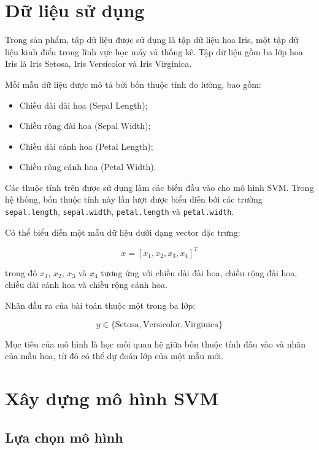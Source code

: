 \documentclass[12pt,a4paper]{report}
\begin{document}
		\section{Dữ liệu sử dụng}
		
		Trong sản phẩm, tập dữ liệu được sử dụng là tập dữ liệu hoa Iris, một tập dữ liệu kinh điển trong lĩnh vực học máy và thống kê. Tập dữ liệu gồm ba lớp hoa
		Iris là Iris Setosa, Iris Versicolor và Iris Virginica.
		
		\noindent
		Mỗi mẫu dữ liệu được mô tả bởi bốn thuộc tính đo lường, bao gồm:
		
		\begin{itemize}
			\item Chiều dài đài hoa (Sepal Length);
			\item Chiều rộng đài hoa (Sepal Width);
			\item Chiều dài cánh hoa (Petal Length);
			\item Chiều rộng cánh hoa (Petal Width).
		\end{itemize}
		
		Các thuộc tính trên được sử dụng làm các biến đầu vào cho mô hình SVM. Trong
		hệ thống, bốn thuộc tính này lần lượt được biểu diễn bởi các trường
		\texttt{sepal.length}, \texttt{sepal.width}, \texttt{petal.length} và
		\texttt{petal.width}.
		
		Có thể biểu diễn một mẫu dữ liệu dưới dạng vector đặc trưng:
		
		$$
		x=
		\left[
		x_1,x_2,x_3,x_4
		\right]^T
		$$
		
		trong đó $x_1$, $x_2$, $x_3$ và $x_4$ tương ứng với chiều dài đài hoa, chiều rộng đài hoa, chiều dài cánh hoa và chiều rộng cánh hoa.
		
		\noindent
		Nhãn đầu ra của bài toán thuộc một trong ba lớp:
		
		$$
		y\in
		\{
		\text{Setosa},
		\text{Versicolor},
		\text{Virginica}
		\}
		$$
		
		Mục tiêu của mô hình là học mối quan hệ giữa bốn thuộc tính đầu vào và nhãn	của mẫu hoa, từ đó có thể dự đoán lớp của một mẫu mới.
		
		
		
		\section{Xây dựng mô hình SVM}
		
		\subsection{Lựa chọn mô hình}
		
\end{document}
